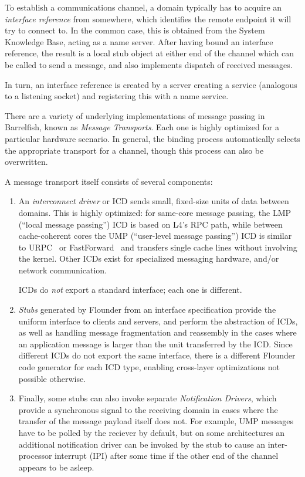 \documentclass[a4paper,twoside]{report} %
\begin{document}
To establish a communications channel, a domain typically has to
acquire an \emph{interface reference} from somewhere, which identifies
the remote endpoint it will try to connect to.  In the common case,
this is obtained from the System Knowledge Base, acting as a name
server. After having bound an interface reference, the result is a
local stub object at either end of the channel which can be called to
send a message, and also implements dispatch of received messages. 

In turn, an interface reference is created by a server creating a
service (analogous to a listening socket) and registering this with a
name service. 

There are a variety of underlying implementations of message passing
in Barrelfish, known as \emph{Message Transports}.  Each one is highly
optimized for a particular hardware scenario.  In general, the binding
process automatically selects the appropriate transport for a channel,
though this process can also be overwritten. 

A message transport itself consists of several components:
\begin{enumerate}
\item An \emph{interconnect driver} or ICD sends small, fixed-size
  units of data between domains.  This is highly optimized: for
  same-core message passing, the LMP (``local message passing'') ICD
  is based on L4's RPC path, while between cache-coherent cores the
  UMP (``user-level message passing'') ICD is similar to
  URPC~\cite{urpc:tocs91} or
  FastForward~\cite{Giacomoni:2008:FEP:1345206.1345215} and transfers
  single cache lines without involving the kernel.  Other ICDs exist
  for specialized messaging hardware, and/or network communication.

  ICDs do \emph{not} export a standard interface; each one is
  different. 
\item \emph{Stubs} generated by Flounder from an interface
  specification provide the uniform interface to clients and servers,
  and perform the abstraction of ICDs, as well as handling message
  fragmentation and reassembly in the cases where an application
  message is larger than the unit transferred by the ICD.  Since
  different ICDs do not export the same interface, there is a
  different Flounder code generator for each ICD type, enabling
  cross-layer optimizations not possible otherwise. 
\item Finally, some stubs can also invoke separate \emph{Notification
  Drivers}, which provide a synchronous signal to the receiving domain
  in cases where the transfer of the message payload itself does not.
  For example, UMP messages have to be polled by the reciever by
  default, but on some architectures an additional notification driver
  can be invoked by the stub to cause an inter-processor interrupt
  (IPI) after some time if the other end of the channel appears to be
  asleep. 
\end{enumerate}
\end{document}
